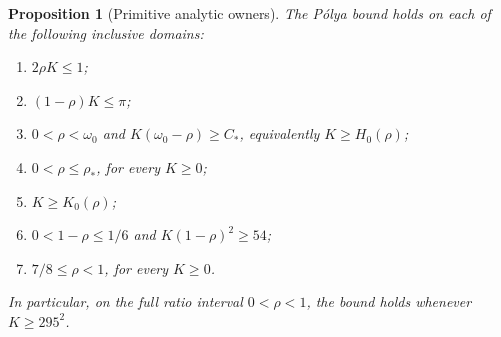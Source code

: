\documentclass[11pt]{article}
\numberwithin{equation}{section}
\newtheorem{proposition}[theorem]{Proposition}
\theoremstyle{definition}
\theoremstyle{remark}
\begin{document}
\begin{proposition}[Primitive analytic owners]
\label{cm:prop-primitive-owners}
The P\'olya bound holds on each of the following inclusive domains:
\begin{enumerate}
\item \(2\rho K\leq1\);
\item \((1-\rho)K\leq\pi\);
\item \(0<\rho<\omega_0\) and
      \(K(\omega_0-\rho)\geq C_*\), equivalently \(K\geq H_0(\rho)\);
\item \(0<\rho\leq\rho_*\), for every \(K\geq0\);
\item \(K\geq K_0(\rho)\);
\item \(0<1-\rho\leq1/6\) and
      \(K(1-\rho)^2\geq54\);
\item \(7/8\leq\rho<1\), for every \(K\geq0\).
\end{enumerate}
In particular, on the full ratio interval \(0<\rho<1\), the bound holds
whenever \(K\geq295^2\).
\end{proposition}
\end{document}
